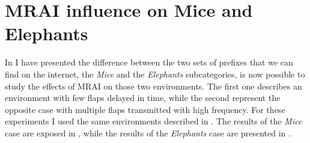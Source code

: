 %

\section{MRAI influence on Mice and Elephants}
\label{sec:bgp_rfd_mrai_influence_mice_elephants}

In  I have presented the difference between the
two sets of prefixes that we can find on the internet, the \textit{Mice} and the
\textit{Elephants} subcategories, is now possible to study the effects of \ac{MRAI}
on those two environments.
The first one describes an environment with few flaps delayed in time, while the
second represent the opposite case with multiple flaps transmitted with high
frequency.
For these experiments I used the same environments described in .
The results of the \textit{Mice} case are exposed in ,
while the results of the \textit{Elephants} case are presented in .

